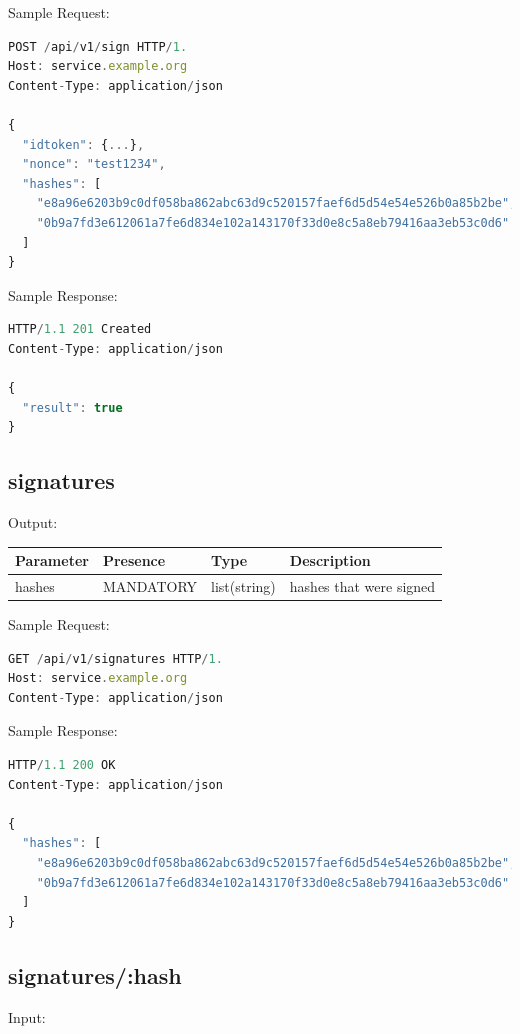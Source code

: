 Sample Request:
\begin{lstlisting}[caption={sign request}, captionpos=b, language=JavaScript, label={lst:signrequest}]
POST /api/v1/sign HTTP/1.
Host: service.example.org
Content-Type: application/json

{
  "idtoken": {...},
  "nonce": "test1234",
  "hashes": [
    "e8a96e6203b9c0df058ba862abc63d9c520157faef6d5d54e54e526b0a85b2be",
    "0b9a7fd3e612061a7fe6d834e102a143170f33d0e8c5a8eb79416aa3eb53c0d6"
  ]
}
\end{lstlisting}

Sample Response:

\begin{lstlisting}[caption={sign response}, captionpos=b, language=JavaScript, label={lst:signresponse}]
HTTP/1.1 201 Created
Content-Type: application/json

{
  "result": true
}
\end{lstlisting}

\subsection{signatures}
Output:

\begin{tabular}{|l|l|l|l|}
	\hline
	Parameter & Presence & Type & Description \\ \hline
	hashes & MANDATORY & list(string) & hashes that were signed \\ \hline
\end{tabular}

Sample Request:

\begin{lstlisting}[caption={signatures request}, captionpos=b, language=JavaScript, label={lst:signaturesrequest}]
GET /api/v1/signatures HTTP/1.
Host: service.example.org
Content-Type: application/json
\end{lstlisting}

Sample Response:

\begin{lstlisting}[caption={signatures response}, captionpos=b, language=JavaScript, label={lst:signaturesresponse}]
HTTP/1.1 200 OK
Content-Type: application/json

{
  "hashes": [
    "e8a96e6203b9c0df058ba862abc63d9c520157faef6d5d54e54e526b0a85b2be",
    "0b9a7fd3e612061a7fe6d834e102a143170f33d0e8c5a8eb79416aa3eb53c0d6"
  ]
}
\end{lstlisting}

\subsection{signatures/:hash}
Input:

